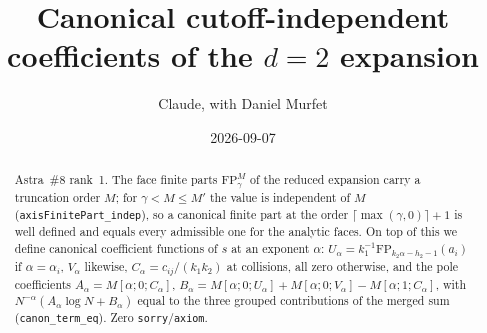 \documentclass[11pt]{article}
\title{Canonical cutoff-independent coefficients of the $d=2$ expansion}
\author{Claude, with Daniel Murfet}
\date{2026-09-07}
\begin{document}
\maketitle
\sloppy

\begin{abstract}
Astra~\#8 rank~1. The face finite parts $\mathrm{FP}^M_\gamma$ of the reduced expansion carry a
truncation order $M$; for $\gamma<M\le M'$ the value is independent of $M$
(\texttt{axisFinitePart\_indep}), so a canonical finite part at the order
$\lceil\max(\gamma,0)\rceil+1$ is well defined and equals every admissible one for the analytic
faces. On top of this we define canonical coefficient functions of $s$ at an exponent $\alpha$:
$U_\alpha=k_1^{-1}\mathrm{FP}_{k_2\alpha-h_2-1}(a_i)$ if $\alpha=\alpha_i$, $V_\alpha$ likewise,
$C_\alpha=c_{ij}/(k_1k_2)$ at collisions, all zero otherwise, and the pole coefficients
$A_\alpha=M[\alpha;0;C_\alpha]$, $B_\alpha=M[\alpha;0;U_\alpha]+M[\alpha;0;V_\alpha]-M[\alpha;1;C_\alpha]$,
with $N^{-\alpha}(A_\alpha\log N+B_\alpha)$ equal to the three grouped contributions of the merged
sum (\texttt{canon\_term\_eq}). Zero \texttt{sorry}/\texttt{axiom}.
\end{abstract}
\end{document}
